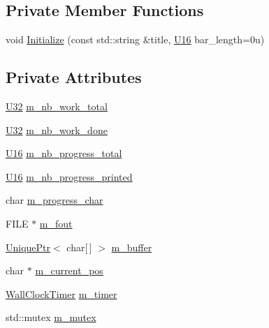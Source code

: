\subsection*{Private Member Functions}
\begin{DoxyCompactItemize}
\item 
void \mbox{\hyperlink{classmage_1_1_progress_reporter_1_1_impl_a6d8010b76ba5c7bac97fc1dadc7fca19}{Initialize}} (const std\+::string \&title, \mbox{\hyperlink{namespacemage_a1701f09b2c3ed62768e1b7d00bf30d0b}{U16}} bar\+\_\+length=0u)
\end{DoxyCompactItemize}
\subsection*{Private Attributes}
\begin{DoxyCompactItemize}
\item 
\mbox{\hyperlink{namespacemage_aa5d6eaabaac3cdd01873d6a3d27e90f3}{U32}} \mbox{\hyperlink{classmage_1_1_progress_reporter_1_1_impl_a58c67973a05cb65276612f56ff4409a6}{m\+\_\+nb\+\_\+work\+\_\+total}}
\item 
\mbox{\hyperlink{namespacemage_aa5d6eaabaac3cdd01873d6a3d27e90f3}{U32}} \mbox{\hyperlink{classmage_1_1_progress_reporter_1_1_impl_ad35ff8031b2826f41912abc44dbd1d24}{m\+\_\+nb\+\_\+work\+\_\+done}}
\item 
\mbox{\hyperlink{namespacemage_a1701f09b2c3ed62768e1b7d00bf30d0b}{U16}} \mbox{\hyperlink{classmage_1_1_progress_reporter_1_1_impl_a286a47e68cdbae261b94dd238e1c9328}{m\+\_\+nb\+\_\+progress\+\_\+total}}
\item 
\mbox{\hyperlink{namespacemage_a1701f09b2c3ed62768e1b7d00bf30d0b}{U16}} \mbox{\hyperlink{classmage_1_1_progress_reporter_1_1_impl_a06efb1bb26ffbba0cd26db5df79021f8}{m\+\_\+nb\+\_\+progress\+\_\+printed}}
\item 
char \mbox{\hyperlink{classmage_1_1_progress_reporter_1_1_impl_a6796267101fa30e107ed0d5031a8dca3}{m\+\_\+progress\+\_\+char}}
\item 
F\+I\+LE $\ast$ \mbox{\hyperlink{classmage_1_1_progress_reporter_1_1_impl_a1ef149837131c4c615a4be082605f62c}{m\+\_\+fout}}
\item 
\mbox{\hyperlink{namespacemage_a3316d7143a973e37adf1110f2e80ca31}{Unique\+Ptr}}$<$ char\mbox{[}$\,$\mbox{]} $>$ \mbox{\hyperlink{classmage_1_1_progress_reporter_1_1_impl_a0ae90634d05295f7c1a8294e343418e2}{m\+\_\+buffer}}
\item 
char $\ast$ \mbox{\hyperlink{classmage_1_1_progress_reporter_1_1_impl_ab1513044548160ad7a6d181ae2618f1b}{m\+\_\+current\+\_\+pos}}
\item 
\mbox{\hyperlink{namespacemage_a06f4035ef59f07892e594bf1178a108a}{Wall\+Clock\+Timer}} \mbox{\hyperlink{classmage_1_1_progress_reporter_1_1_impl_a8eea94dc2c87abc34d80ad61b5adea2e}{m\+\_\+timer}}
\item 
std\+::mutex \mbox{\hyperlink{classmage_1_1_progress_reporter_1_1_impl_acc8b21e5c74a202b1fb8f80a26132bfc}{m\+\_\+mutex}}
\end{DoxyCompactItemize}


